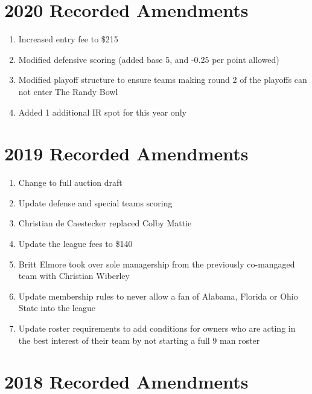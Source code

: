 \documentclass[
]{book}
\providecommand{\tightlist}{%
  \setlength{\itemsep}{0pt}\setlength{\parskip}{0pt}}
\begin{document}
\hypertarget{recorded-amendments-1}{%
\section{2020 Recorded Amendments}\label{recorded-amendments-1}}

\begin{enumerate}
\def\labelenumi{\arabic{enumi}.}
\tightlist
\item
  Increased entry fee to \$215
\item
  Modified defensive scoring (added base 5, and -0.25 per point allowed)
\item
  Modified playoff structure to ensure teams making round 2 of the playoffs can not enter The Randy Bowl
\item
  Added 1 additional IR spot for this year only
\end{enumerate}

\hypertarget{recorded-amendments-2}{%
\section{2019 Recorded Amendments}\label{recorded-amendments-2}}

\begin{enumerate}
\def\labelenumi{\arabic{enumi}.}
\tightlist
\item
  Change to full auction draft
\item
  Update defense and special teams scoring
\item
  Christian de Caestecker replaced Colby Mattie
\item
  Update the league fees to \$140
\item
  Britt Elmore took over sole managership from the previously co-mangaged team with Christian Wiberley
\item
  Update membership rules to never allow a fan of Alabama, Florida or Ohio State into the league
\item
  Update roster requirements to add conditions for owners who are acting in the best interest of their team by not starting a full 9 man roster
\end{enumerate}

\hypertarget{recorded-amendments-3}{%
\section{2018 Recorded Amendments}\label{recorded-amendments-3}}
\end{document}
